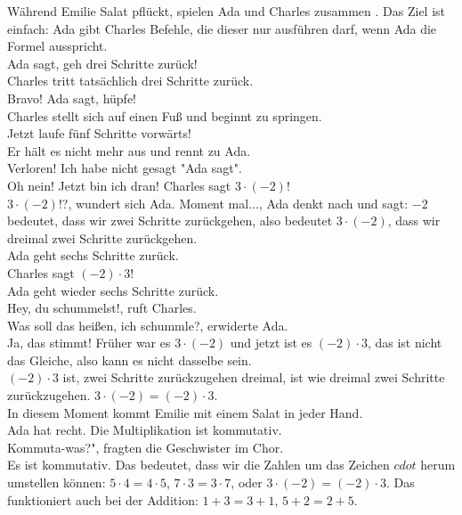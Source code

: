 Während Emilie Salat pflückt, spielen Ada und Charles zusammen . Das Ziel ist einfach: Ada gibt Charles Befehle, die dieser nur ausführen darf, wenn Ada die Formel  ausspricht.\\
\frqq{}Ada sagt, geh drei Schritte zurück!\flqq{}\\
Charles tritt tatsächlich drei Schritte zurück.\\
\frqq{}Bravo! Ada sagt, hüpfe!\flqq{}\\
Charles stellt sich auf einen Fuß und beginnt zu springen.\\
\frqq{}Jetzt laufe fünf Schritte vorwärts!\flqq{}\\
Er hält es nicht mehr aus und rennt zu Ada.\\
\frqq{}Verloren! Ich habe nicht gesagt "Ada sagt".\flqq{}\\
\frqq{}Oh nein! Jetzt bin ich dran! Charles sagt $3 \cdot (-2)$!\flqq{}\\
\frqq{}$3 \cdot (-2)$!?\flqq{}, wundert sich Ada. \frqq{}Moment mal...\flqq{}, Ada denkt nach und sagt: \frqq{}$-2$ bedeutet, dass wir zwei Schritte zurückgehen, also bedeutet $3 \cdot (-2)$, dass wir dreimal zwei Schritte zurückgehen.\flqq{}\\
Ada geht sechs Schritte zurück.\\
\frqq{}Charles sagt $(-2) \cdot 3$!\flqq{}\\
Ada geht wieder sechs Schritte zurück.\\
\frqq{}Hey, du schummelst!\flqq{}, ruft Charles.\\
\frqq{}Was soll das heißen, ich schummle?\flqq{}, erwiderte Ada.\\
\frqq{}Ja, das stimmt! Früher war es $3 \cdot (-2)$ und jetzt ist es $(-2) \cdot 3$, das ist nicht das Gleiche, also kann es nicht dasselbe sein.\flqq{}\\
\frqq{}$(-2) \cdot 3$ ist, zwei Schritte zurückzugehen dreimal, ist wie dreimal zwei Schritte zurückzugehen. $3 \cdot (-2) = (-2) \cdot 3$.\flqq{}\\
In diesem Moment kommt Emilie mit einem Salat in jeder Hand.\\
\frqq{}Ada hat recht. Die Multiplikation ist kommutativ.\flqq{}\\
\frqq{}Kommuta-was?", fragten die Geschwister im Chor.\flqq{}\\
\frqq{}Es ist kommutativ. Das bedeutet, dass wir die Zahlen um das Zeichen $cdot$ herum umstellen können: $5 \cdot 4 = 4 \cdot 5$, $7 \cdot 3 = 3 \cdot 7$, oder $3 \cdot (-2) = (-2) \cdot 3$. Das funktioniert auch bei der Addition: $1 +3 = 3 + 1$, $5 + 2 = 2 + 5$.\flqq{}\\

